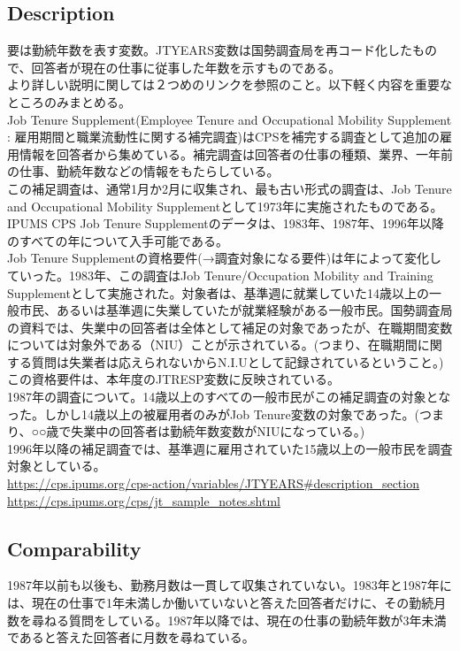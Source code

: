 \documentclass{jsarticle}
\begin{document}
\subsection{Description}
要は勤続年数を表す変数。JTYEARS変数は国勢調査局を再コード化したもので、回答者が現在の仕事に従事した年数を示すものである。\\
  
より詳しい説明に関しては２つめのリンクを参照のこと。以下軽く内容を重要なところのみまとめる。\\
  
Job Tenure Supplement(Employee Tenure and Occupational Mobility Supplement : 雇用期間と職業流動性に関する補完調査)はCPSを補完する調査として追加の雇用情報を回答者から集めている。補完調査は回答者の仕事の種類、業界、一年前の仕事、勤続年数などの情報をもたらしている。\\
  
この補足調査は、通常1月か2月に収集され、最も古い形式の調査は、Job Tenure and Occupational Mobility Supplementとして1973年に実施されたものである。IPUMS CPS Job Tenure Supplementのデータは、1983年、1987年、1996年以降のすべての年について入手可能である。\\
  
Job Tenure Supplementの資格要件(→調査対象になる要件)は年によって変化していった。1983年、この調査はJob Tenure/Occupation Mobility and Training Supplementとして実施された。対象者は、基準週に就業していた14歳以上の一般市民、あるいは基準週に失業していたが就業経験がある一般市民。国勢調査局の資料では、失業中の回答者は全体として補足の対象であったが、在職期間変数については対象外である（NIU）ことが示されている。(つまり、在職期間に関する質問は失業者は応えられないからN.I.Uとして記録されているということ。)この資格要件は、本年度のJTRESP変数に反映されている。\\
  
1987年の調査について。14歳以上のすべての一般市民がこの補足調査の対象となった。しかし14歳以上の被雇用者のみがJob Tenure変数の対象であった。(つまり、○○歳で失業中の回答者は勤続年数変数がNIUになっている。)\\
  
1996年以降の補足調査では、基準週に雇用されていた15歳以上の一般市民を調査対象としている。\\
\url{https://cps.ipums.org/cps-action/variables/JTYEARS#description_section}\\
\url{https://cps.ipums.org/cps/jt_sample_notes.shtml}

\subsection{Comparability}
1987年以前も以後も、勤務月数は一貫して収集されていない。1983年と1987年には、現在の仕事で1年未満しか働いていないと答えた回答者だけに、その勤続月数を尋ねる質問をしている。1987年以降では、現在の仕事の勤続年数が3年未満であると答えた回答者に月数を尋ねている。\\
  
\end{document}
